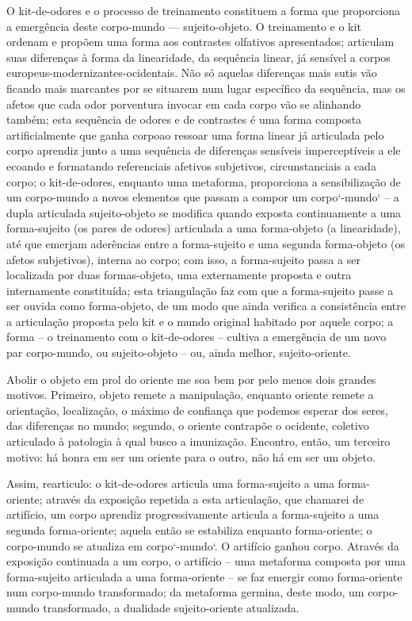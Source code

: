 O kit-de-odores e o processo de treinamento constituem a forma que proporciona a emergência deste corpo-mundo --- sujeito-objeto. O treinamento e o kit ordenam e propõem uma forma aos contrastes olfativos apresentados; articulam suas diferenças à forma da linearidade, da sequência linear, já sensível a corpos europeus-modernizantes-ocidentais. Não só aquelas diferenças mais sutis vão ficando mais marcantes por se situarem num lugar específico da sequência, mas os afetos que cada odor porventura invocar em cada corpo vão se alinhando também; esta sequência de odores e de contrastes é uma forma composta artificialmente que \guillemetleft ganha corpo\guillemetright ao ressoar uma forma linear já articulada pelo corpo aprendiz junto a uma sequência de diferenças sensíveis imperceptíveis a ele ecoando e formatando referenciais afetivos subjetivos, circunstanciais a cada corpo; o kit-de-odores, enquanto uma metaforma, proporciona a sensibilização de um corpo-mundo a novos elementos que passam a compor um corpo`-mundo` -- a dupla articulada sujeito-objeto se modifica quando exposta continuamente a uma forma-sujeito (os pares de odores) articulada a uma forma-objeto (a linearidade), até que emerjam aderências entre a forma-sujeito e uma segunda forma-objeto (os afetos subjetivos), interna ao corpo; com isso, a forma-sujeito passa a ser localizada por duas formas-objeto, uma externamente proposta e outra internamente constituída; esta triangulação faz com que a forma-sujeito passe a ser ouvida como forma-objeto, de um modo que ainda verifica a consistência entre a articulação proposta pelo kit e o mundo original habitado por aquele corpo; a forma -- o treinamento com o kit-de-odores -- cultiva a emergência de um novo par corpo-mundo, ou sujeito-objeto -- ou, ainda melhor, sujeito-oriente.

Abolir o objeto em prol do oriente me soa bem por pelo menos dois grandes motivos. Primeiro, objeto remete a manipulação, enquanto oriente remete a orientação, localização, o máximo de confiança que podemos esperar dos seres, das diferenças no mundo; segundo, o oriente contrapõe o ocidente, coletivo articulado à patologia à qual busco a imunização. Encontro, então, um terceiro motivo: há honra em ser um oriente para o outro, não há em ser um objeto.

Assim, rearticulo: o kit-de-odores articula uma forma-sujeito a uma forma-oriente; através da exposição repetida a esta articulação, que chamarei de artifício, um corpo aprendiz progressivamente articula a forma-sujeito a uma segunda forma-oriente; aquela então se estabiliza enquanto forma-oriente; o corpo-mundo se atualiza em corpo`-mundo`. O artifício \guillemetleft ganhou corpo\guillemetright. Através da exposição continuada a um corpo, o artifício -- uma metaforma composta por uma forma-sujeito articulada a uma forma-oriente -- se faz emergir como forma-oriente num corpo-mundo transformado; da metaforma germina, deste modo, um corpo-mundo transformado, a dualidade sujeito-oriente atualizada.

